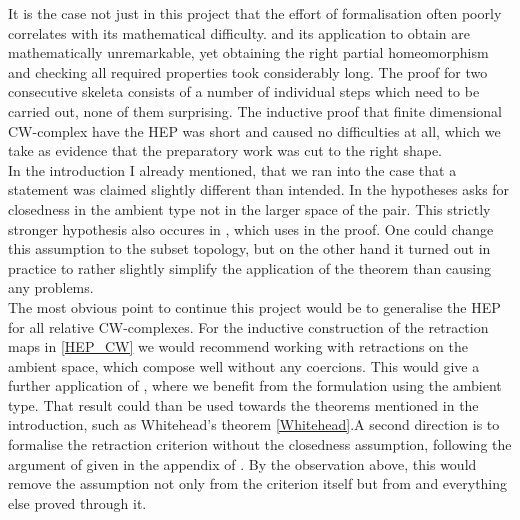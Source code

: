 \documentclass[11pt, a4paper, english]{article}
\theoremstyle{plain}
\theoremstyle{definition}
\theoremstyle{remark}
\numberwithin{equation}{section}
\numberwithin{theorem}{section}
\begin{document}
It is the case not just in this project that the effort of formalisation often poorly correlates with its mathematical difficulty.  and its application to obtain  are mathematically unremarkable, yet obtaining the right partial homeomorphism and checking all required properties took considerably long. The proof for two consecutive skeleta consists of a number of individual steps which need to be carried out, none of them surprising. The inductive proof that finite dimensional CW-complex have the HEP was short and caused no difficulties at all, which we take as evidence that the preparatory work was cut to the right shape. \\

In the introduction I already mentioned, that we ran into the case that a statement was claimed slightly different than intended. In  the hypotheses  asks for closedness in the ambient type not in the larger space of the pair. This strictly stronger hypothesis also occures in , which uses  in the proof. One could change this assumption to the subset topology, but on the other hand it turned out in practice to rather slightly simplify the application of the theorem than causing any problems. \\

The most obvious point to continue this project would be to generalise the HEP for all relative CW-complexes. For the inductive construction of the retraction maps in \cref{HEP_CW} we would recommend working with retractions on the ambient space, which compose well without any coercions. This would give a further application of , where we benefit from the formulation using the ambient type. That result could than be used towards the theorems mentioned in the introduction, such as Whitehead's theorem \cref{Whitehead}.A second direction is to formalise the retraction criterion without the closedness assumption, following the argument of \cite{STM} given in the appendix of \cite{HAT01}. By the observation above, this would remove the assumption not only from the criterion itself but from  and everything else proved through it. \\ 

\clearpage
{}
\printbibliography
\end{document}
